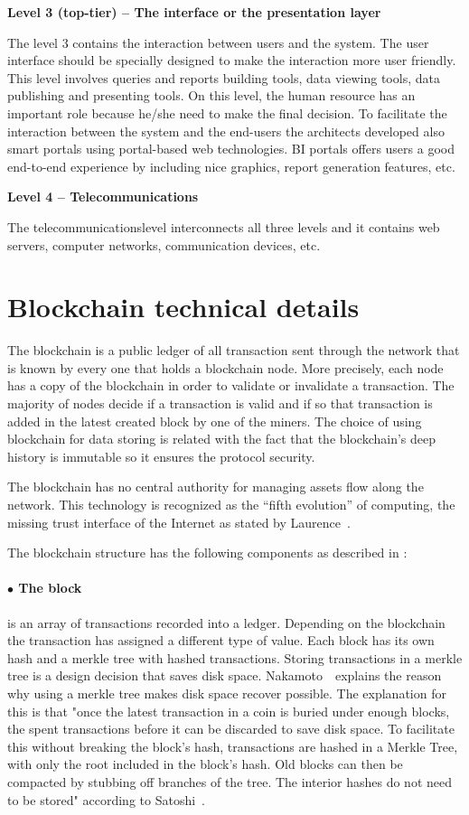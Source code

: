 \textbf{Level 3 (top-tier) – The interface or the presentation layer}

The level 3 contains the interaction between users and the system. The user interface should be specially designed to make the interaction more user friendly. This level involves queries and reports building tools, data viewing tools, data publishing and presenting tools. On this level, the human resource has an important role because he/she need to make the final decision. To facilitate the interaction between the system and the end-users the architects developed also smart portals using portal-based web technologies. BI portals offers users a good end-to-end experience by including nice graphics, report generation features, etc.

\textbf{Level 4 – Telecommunications}

The telecommunicationslevel interconnects all three levels and it contains web servers, computer networks, communication devices, etc.


\section{Blockchain technical details}
\label{sec:chapter2-section1}
The blockchain is a public ledger of all transaction sent through the network that is known by every one that holds a blockchain node. More precisely, each node has a copy of the blockchain in order to validate or invalidate a transaction. The majority of nodes decide if a transaction is valid and if so that transaction is added in the latest created block by one of the miners. The choice of using blockchain for data storing is related with the fact that the blockchain’s deep history is immutable so it ensures the protocol security.

The blockchain has no central authority for managing assets flow along the network. This technology is recognized as the “fifth evolution” of computing, the missing trust interface of the Internet as stated by Laurence~\cite{blockchaind}.

The blockchain structure has the following components as described in :
\paragraph{$\bullet$ The block}is an array of transactions recorded into a ledger. Depending on the blockchain the transaction has assigned a different type of value.
Each block has its own hash and a merkle tree with hashed transactions. Storing transactions in a merkle tree is a design decision that saves disk space. Nakamoto~\cite{bitcoinwhitepaper}\ explains the reason why using a merkle tree makes disk space recover possible. The explanation for this is that "once the latest transaction in a coin is buried under enough blocks, the spent transactions before it can be discarded to save disk space. To facilitate this without breaking the block’s hash, transactions are hashed in a Merkle Tree, with only the root included in the block’s hash. Old blocks can then be compacted by stubbing off branches of the tree. The interior hashes do not need to be stored" according to Satoshi~\cite{bitcoinwhitepaper}.
